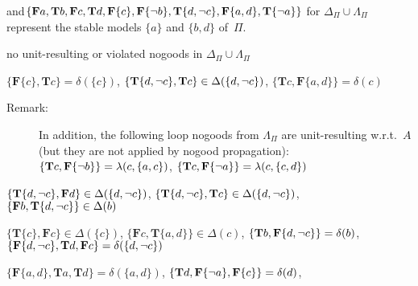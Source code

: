 \begin{Loesung}
{and\linebreak[4]%
$\{\mathbf{F}a,\mathbf{T}b,\mathbf{F}c,\mathbf{T}d,
   \mathbf{F}\{c\},\mathbf{F}\{{\neg{b}}\},\mathbf{T}\{d,{\neg{c}}\},\mathbf{F}\{a,d\},\mathbf{T}\{{\neg{a}}\}\}$
for 
$\Delta_\Pi\cup\Lambda_\Pi$ %
represent the stable models $\{a\}$ and $\{b,d\}$ of~$\Pi$.
\begin{UList}
\item no unit-resulting or violated nogoods in $\Delta_\Pi\cup\Lambda_\Pi$
\item $\{\mathbf{F}\{c\},\mathbf{T}c\}=\delta(\{c\})$,\newline
      $\{\mathbf{T}\{d,{\neg{c}}\},\mathbf{T}c\}\in\Delta(\{d,{\neg{c}}\})$,\newline
      $\{\mathbf{T}c,\mathbf{F}\{a,d\}\}=\delta(c)$
      \begin{description}
      \item[Remark:]
      In addition, the following loop nogoods from $\Lambda_\Pi$ are unit-resulting w.r.t.~$A$
      (but they are not applied by nogood propagation):\newline
      $\{\mathbf{T}c,\mathbf{F}\{{\neg{b}}\}\}=\lambda(c,\{a,c\})$,\newline
      $\{\mathbf{T}c,\mathbf{F}\{{\neg{a}}\}\}=\lambda(c,\{c,d\})$
      \end{description}
\item $\{\mathbf{T}\{d,{\neg{c}}\},\mathbf{F}d\}\in\Delta(\{d,{\neg{c}}\})$,\newline
      $\{\mathbf{T}\{d,{\neg{c}}\},\mathbf{T}c\}\in\Delta(\{d,{\neg{c}}\})$,\newline
      $\{\mathbf{F}b,\mathbf{T}\{d,{\neg{c}}\}\}\in\Delta(b)$
\item $\{\mathbf{T}\{c\},\mathbf{F}c\}\in\Delta(\{c\})$,\newline
      $\{\mathbf{F}c,\mathbf{T}\{a,d\}\}\in\Delta(c)$,\newline
      $\{\mathbf{T}b,\mathbf{F}\{d,{\neg{c}}\}\}=\delta(b)$,\newline
      $\{\mathbf{F}\{d,{\neg{c}}\},\mathbf{T}d,\mathbf{F}c\}=\delta(\{d,{\neg{c}}\})$
\item $\{\mathbf{F}\{a,d\},\mathbf{T}a,\mathbf{T}d\}=\delta(\{a,d\})$,\newline
      $\{\mathbf{T}d,\mathbf{F}\{{\neg{a}}\},\mathbf{F}\{c\}\}=\delta(d)$,\newline

\end{UList}}
\end{Loesung}
